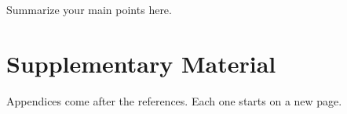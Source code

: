 \documentclass[stu,12pt,floatsintext]{apa7}
\begin{document}
Summarize your main points here.

\printbibliography

\appendix
\section{Supplementary Material}

Appendices come after the references. Each one starts on a new page.
\end{document}
